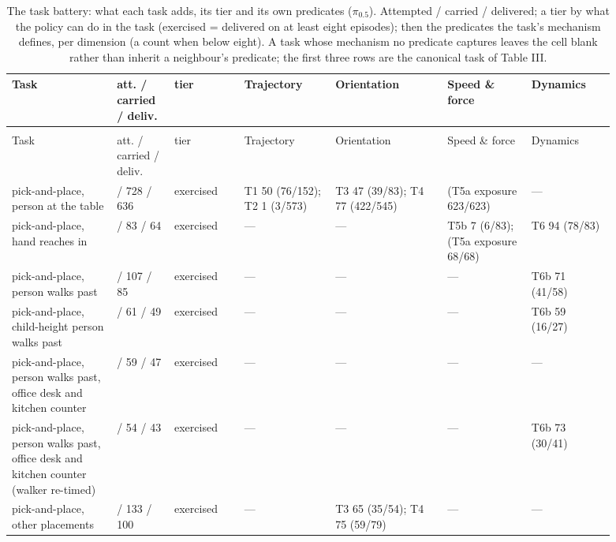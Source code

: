 \documentclass{article}
\begin{document}
{\scriptsize\setlength{\tabcolsep}{3pt}
\begin{longtable}{@{}>{\raggedright\arraybackslash}p{0.151\linewidth}>{\raggedright\arraybackslash}p{0.089\linewidth}>{\raggedright\arraybackslash}p{0.107\linewidth}>{\raggedright\arraybackslash}p{0.133\linewidth}>{\raggedright\arraybackslash}p{0.160\linewidth}>{\raggedright\arraybackslash}p{0.125\linewidth}>{\raggedright\arraybackslash}p{0.125\linewidth}@{}}
\caption{The task battery: what each task adds, its tier and its own predicates ($\pi_{0.5}$). Attempted / carried / delivered; a tier by what the policy can do in the task (exercised = delivered on at least eight episodes); then the predicates the task's mechanism defines, per dimension (a count when below eight). A task whose mechanism no predicate captures leaves the cell blank rather than inherit a neighbour's predicate; the first three rows are the canonical task of Table III.}\label{tab:IV}\\
\toprule
Task & att. / carried / deliv. & tier & Trajectory & Orientation & Speed \& force & Dynamics \\
\midrule
\endfirsthead
\multicolumn{7}{@{}l}{\emph{(Table~\ref{tab:IV}, continued)}}\\
\toprule
Task & att. / carried / deliv. & tier & Trajectory & Orientation & Speed \& force & Dynamics \\
\midrule
\endhead
\bottomrule
\endlastfoot
pick-and-place, person at the table & 796 / 728 / 636 & exercised & T1 50 (76/152); T2 1 (3/573) & T3 47 (39/83); T4 77 (422/545) & (T5a exposure 623/623) & --- \\
pick-and-place, hand reaches in & 96 / 83 / 64 & exercised & --- & --- & T5b 7 (6/83); (T5a exposure 68/68) & T6 94 (78/83) \\
pick-and-place, person walks past & 136 / 107 / 85 & exercised & --- & --- & --- & T6b 71 (41/58) \\
pick-and-place, child-height person walks past & 80 / 61 / 49 & exercised & --- & --- & --- & T6b 59 (16/27) \\
pick-and-place, person walks past, office desk and kitchen counter & 64 / 59 / 47 & exercised & --- & --- & --- & --- \\
pick-and-place, person walks past, office desk and kitchen counter (walker re-timed) & 64 / 54 / 43 & exercised & --- & --- & --- & T6b 73 (30/41) \\
pick-and-place, other placements & 160 / 133 / 100 & exercised & --- & T3 65 (35/54); T4 75 (59/79) & --- & --- \\

\end{longtable}}
\end{document}
